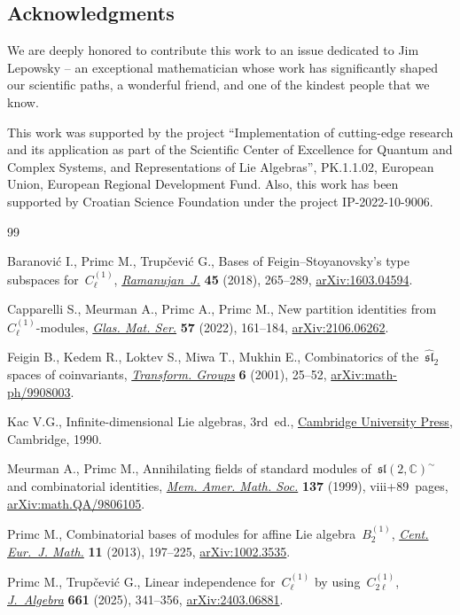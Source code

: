 \documentclass[pdftex]{sigma}
\numberwithin{equation}{section}
\begin{document}
 \subsection*{Acknowledgments}
We are deeply honored to contribute this work to an issue dedicated to Jim Lepowsky -- an exceptional mathematician whose work has significantly shaped our scientific paths, a wonderful friend, and one of the kindest people that we know.

This work was supported by the project ``Implementation of cutting-edge research and its application as part of the Scientific Center of Excellence for Quantum and Complex Systems, and Representations of Lie Algebras'', PK.1.1.02, European Union, European Regional Development Fund. Also, this work has been supported by Croatian Science Foundation under the project IP-2022-10-9006.


\begin{thebibliography}{99}
\footnotesize\itemsep=0pt

Baranovi\'c I., Primc M., Trup\v{c}evi\'c G., Bases of
  {F}eigin--{S}toyanovsky's type subspaces for~{$C_\ell^{(1)}$},
  \href{https://doi.org/10.1007/s11139-016-9840-y}{\textit{Ramanujan~J.}}
  \textbf{45} (2018), 265--289,
  \href{http://arxiv.org/abs/1603.04594}{arXiv:1603.04594}.

Capparelli S., Meurman A., Primc A., Primc M., New partition identities
  from~{$C^{(1)}_\ell$}-modules,
  \href{https://doi.org/10.3336/gm.57.2.01}{\textit{Glas. Mat. Ser.}}
  \textbf{57} (2022), 161--184,
  \href{http://arxiv.org/abs/2106.06262}{arXiv:2106.06262}.

Feigin B., Kedem R., Loktev S., Miwa T., Mukhin E., Combinatorics of
  the~{$\widehat{\mathfrak{sl}}_2$} spaces of coinvariants,
  \href{https://doi.org/10.1007/BF01236061}{\textit{Transform. Groups}}
  \textbf{6} (2001), 25--52,
  \href{http://arxiv.org/abs/math-ph/9908003}{arXiv:math-ph/9908003}.

Kac V.G., Infinite-dimensional {L}ie algebras, 3rd~ed.,
  \href{https://doi.org/10.1017/CBO9780511626234}{Cambridge University Press}, Cambridge, 1990.

Meurman A., Primc M., Annihilating fields of standard modules
  of~{$\mathfrak{sl}(2,\mathbb{C})^\sim$} and combinatorial identities,
  \href{https://doi.org/10.1090/memo/0652}{\textit{Mem. Amer. Math. Soc.}}
  \textbf{137} (1999), viii+89~pages,
  \href{http://arxiv.org/abs/math.QA/9806105}{arXiv:math.QA/9806105}.

Primc M., Combinatorial bases of modules for affine {L}ie
  algebra~{$B_2^{(1)}$},
  \href{https://doi.org/10.2478/s11533-012-0111-x}{\textit{Cent. Eur.~J.
  Math.}} \textbf{11} (2013), 197--225,
  \href{http://arxiv.org/abs/1002.3535}{arXiv:1002.3535}.

Primc M., Trup\v{c}evi\'c G., Linear independence for~{$C_\ell^{(1)}$} by
  using~{$C_{2\ell}^{(1)}$},
  \href{https://doi.org/10.1016/j.jalgebra.2024.08.003}{\textit{J.~Algebra}}
  \textbf{661} (2025), 341--356,
  \href{http://arxiv.org/abs/2403.06881}{arXiv:2403.06881}.

\end{thebibliography}\LastPageEnding
\end{document}
